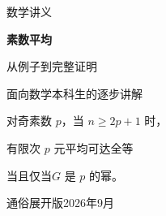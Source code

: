 \documentclass[11pt,a4paper,oneside,openany]{book}
\begin{document}
\frontmatter
\begin{titlepage}
\centering
\vspace*{25mm}
{\sffamily\Large 数学讲义\par}
\vspace{15mm}
{\Huge\bfseries 素数平均\par}
\vspace{7mm}
{\LARGE 从例子到完整证明\par}
\vspace{16mm}
{\large 面向数学本科生的逐步讲解\par}
\vfill
\begin{minipage}{.79\textwidth}
\large
对奇素数 $p$，当 $n\ge 2p+1$ 时，\par
有限次 $p$ 元平均可达全等\par
\hfill 当且仅当\quad $G$ 是 $p$ 的幂。
\end{minipage}
\vfill
{\large 通俗展开版\quad 2026年9月\par}
\end{titlepage}

\tableofcontents
\mainmatter


















\appendix

\backmatter

\end{document}
